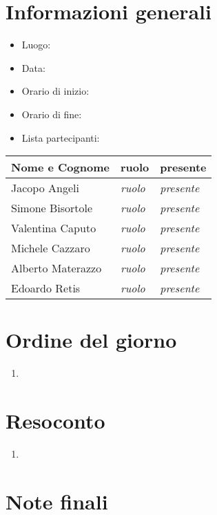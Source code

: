 \documentclass[12pt]{article}
\begin{document}

\clearpage


\tableofcontents
\clearpage

\section{Informazioni generali} 
\begin{itemize}
    \item Luogo:
    \item Data:
    \item Orario di inizio:
    \item Orario di fine:
    \item Lista partecipanti:
\end{itemize}
\begin{center}
\begin{tabularx}{0.8\textwidth} { 
   >{\raggedright\arraybackslash}X 
   >{\centering\arraybackslash}X 
   >{\raggedleft\arraybackslash}X  }
\hline
    \textbf{Nome e Cognome} &      \textbf{ruolo}   &   \textbf{presente}\\
\hline
    Jacopo Angeli           &       \emph{ruolo}    &   \emph{presente}\\
    Simone Bisortole        &       \emph{ruolo}    &   \emph{presente}\\
    Valentina Caputo        &       \emph{ruolo}    &   \emph{presente}\\
    Michele Cazzaro         &       \emph{ruolo}    &   \emph{presente}\\
    Alberto Materazzo       &       \emph{ruolo}    &   \emph{presente}\\
    Edoardo Retis           &       \emph{ruolo}    &   \emph{presente}\\
\end{tabularx}
\end{center}

\vspace{5mm}

\section{Ordine del giorno}
\begin{enumerate}
    \item 
\end{enumerate}

\vspace{5mm}

\section{Resoconto}
\begin{enumerate}
    \item 
\end{enumerate}

\vspace{5mm}

\section{Note finali}
\end{document}
